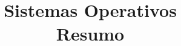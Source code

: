 \documentclass[10pt,a4paper]{report}
\title{\LARGE{Sistemas Operativos} \\ \vspace{0.5cm} \normalsize{Resumo}}
\date{}
\begin{document}
\maketitle
\tableofcontents

\begin{comment}
\chapter{Arquitetura}
\section{Introdução}
Um sistema computacional é constituído por:
\begin{itemize}
\item Hardware
\item Sistema Operativo
\item Programas Aplicativos
\item Utilizadores
\end{itemize}
O sistema operativo é um programa que atua como intermediário entre o utilizador e o hardware e controla a execução de todos os tipos de programas.\\
\\
Na prática, o SO gere todos os recursos do sistema, resolve conflitos entre pedidos, evita erros e promove um uso justo e eficiente dos recursos, para além de fornecer um ambiente para interação com o utilizador e de execução de programas.
\section{Organização}
Num sistema computacional, o CPU e os controladores de dispositivos ligam-se por um barramento comum que dá acesso á memória partilhada, funcionando concorrentemente e competindo pela memória.\\
\\
O CPU não interage diretamente com os outros dispositivos, apenas movendo dados da memória principal para os buffers dos controladores, que por sua vez fazem E/S com o seu respetivo dispositivo. Quando um dispositivo termina uma operação, o seu controlador informa o CPU através de interrupções.
\subsection{Multiprogramação}
Um único utilizador não consegue manter o CPU e os dispositivos de E/S sempre ocupados. O objetivo da multiprogramação é organizar os jobs de forma a que o CPU tenha sempre um para executar. Alguns jobs são mantidos em memória e quando um job em execução tem de esperar, outro toma o seu lugar.

\end{comment}
\end{document}
